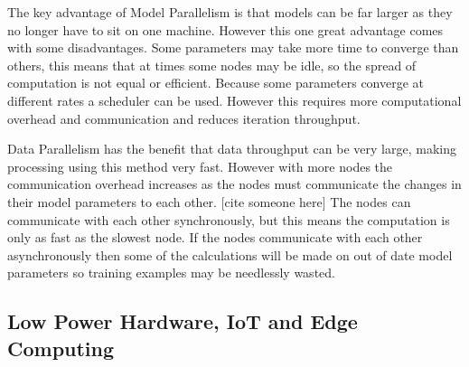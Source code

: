 The key advantage of Model Parallelism is that models can be far larger as they
no longer have to sit on one machine. However this one great advantage comes
with some disadvantages. Some parameters may take more time to converge than
others, this means that at times some nodes may be idle, so the spread of
computation is not equal or efficient. \cite{Dean2012Distbelief} Because some
parameters converge at different rates a scheduler can be used. However this
requires more computational overhead and communication and reduces iteration
throughput. \cite{kim2016STRADS}

Data Parallelism has the benefit that data throughput can be very large, making
processing using this method very fast. However with more nodes the
communication overhead increases as the nodes must communicate the changes in
their model parameters to each other. [cite someone here] The nodes can
communicate with each other synchronously, but this means the computation is
only as fast as the slowest node. If the nodes communicate with each other
asynchronously then some of the calculations will be made on out of date model
parameters so training examples may be needlessly wasted.

\subsection{Low Power Hardware, IoT and Edge Computing}



